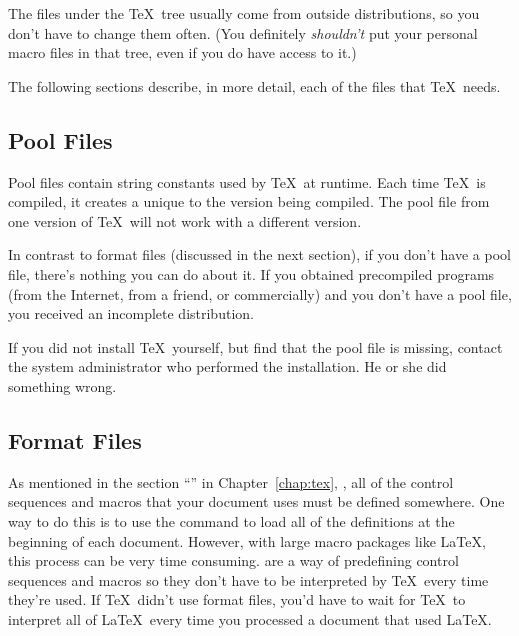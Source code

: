 The files under the \TeX\ tree usually come from outside distributions,
so you don't have to change them often. (You definitely \emph{shouldn't}
put your personal macro files in that tree, even if you do have access
to it.)

The following sections describe, in more detail, each of the files that \TeX\ needs.

\subsection{Pool Files}

Pool files contain string constants used by \TeX\ at runtime.
Each time \TeX\ is compiled, it creates a  unique
to the version being compiled.  The pool file from one version of \TeX\ will
not work with a different version.

In contrast to format files (discussed in the next section),
if you don't have a pool file, there's nothing you can do about it.
If you obtained precompiled programs (from the Internet, from a friend,
or commercially) and you don't have a pool file, you received an
incomplete distribution.

If you did not install \TeX\ yourself, but find that the pool file is
missing, contact the system administrator who performed the
installation.  He or she did something wrong.

\subsection{Format Files}
\label{run:sec:formatfiles}

As mentioned in the section ``'' in
Chapter~\ref{chap:tex}, \textit{}, all of the control
sequences and macros that your document uses must be defined
somewhere.  One way to do this is to use the  command to
load all of the definitions at the beginning of each document.
However, with large macro packages like \LaTeX, this process can be very time
consuming.   are a way of predefining control
sequences and macros so they don't have to be interpreted by \TeX\
every time they're used.  If \TeX\ didn't use format files, you'd
have to wait for \TeX\ to interpret all of \LaTeX\ every time you
processed a document that used \LaTeX.

